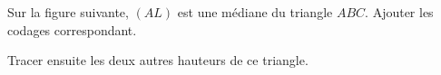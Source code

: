 
\begin{exercice}\label{exosmath-0930}

    Sur la figure suivante, \( (AL)\) est une médiane du triangle \( ABC\). Ajouter les codages correspondant.
\begin{center}

\end{center}
Tracer ensuite les deux autres hauteurs de ce triangle.

\end{exercice}
